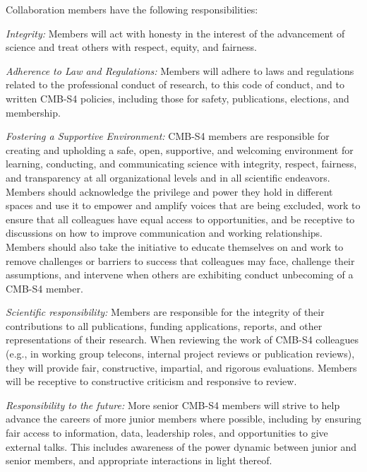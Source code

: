 \documentclass[12pt]{article}
\begin{document}
Collaboration members have the following responsibilities:

\medskip

{\it Integrity:} Members will act with honesty in the interest of the advancement of science and treat others with respect, equity, and fairness. 

{\it Adherence to Law and Regulations:} Members will adhere to laws and regulations related to the professional conduct of research, to this code of conduct, and to written CMB-S4 policies, including those for safety, publications, elections, and membership.

{\it Fostering a Supportive Environment:} CMB-S4 members are responsible for creating and upholding a safe, open, supportive, and welcoming environment for learning, conducting, and communicating science with integrity, respect, fairness, and transparency at all organizational levels and in all scientific endeavors. Members should acknowledge the privilege and power they hold in different spaces and use it to empower and amplify voices that are being excluded, work to ensure that all colleagues have equal access to opportunities, and be receptive to discussions on how to improve communication and working relationships. Members should also take the initiative to educate themselves on and work to remove challenges or barriers to success that colleagues may face, challenge their assumptions, and intervene when others are exhibiting conduct unbecoming of a CMB-S4 member.

{\it Scientific responsibility:} Members are responsible for the integrity of their contributions to all publications, funding applications, reports, and other representations of their research. When reviewing the work of CMB-S4 colleagues (e.g., in working group telecons, internal project reviews or publication reviews), they will provide fair, constructive, impartial, and rigorous evaluations.  Members will be receptive to constructive criticism and responsive to review. 

{\it Responsibility to the future:} More senior CMB-S4 members will strive to help advance the careers of more junior members where possible, including by ensuring fair access to information, data, leadership roles, and opportunities to give external talks. This includes awareness of the power dynamic between junior and senior members, and appropriate interactions in light thereof.

\end{document}
